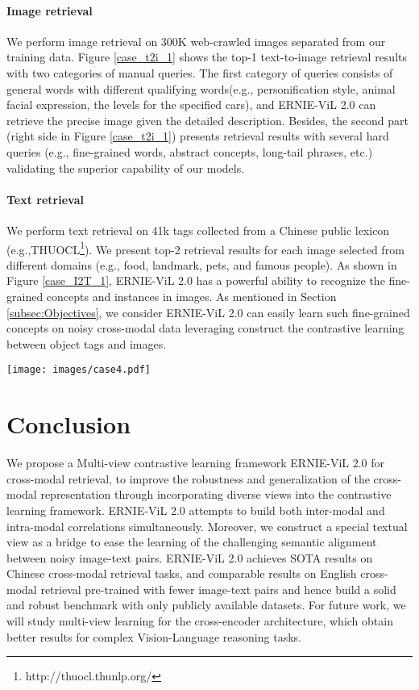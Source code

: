 \documentclass{article}
\begin{document}
\paragraph{Image retrieval} We perform image retrieval on 300K web-crawled images separated from our training data. Figure \ref{case_t2i_1} shows the top-1 text-to-image retrieval results with two categories of manual queries. The first category of queries consists of general words with different qualifying words(e.g., personification style, animal facial expression, the levels for the specified cars), and ERNIE-ViL 2.0 can retrieve the precise image given the detailed description. Besides, the second part (right side in Figure \ref{case_t2i_1}) presents retrieval results with several hard queries (e.g., fine-grained words, abstract concepts, long-tail phrases, etc.) validating the superior capability of our models.


\paragraph{Text retrieval}  We perform text retrieval on 41k tags collected from a Chinese public lexicon (e.g.,THUOCL\footnote{http://thuocl.thunlp.org/}). We present top-2 retrieval results for each image selected from different domains (e.g., food, landmark, pets, and famous people). As shown in Figure \ref{case_I2T_1}, ERNIE-ViL 2.0 has a powerful ability to recognize the fine-grained concepts and instances in images. As mentioned in Section \ref{subsec:Objectives}, we consider ERNIE-ViL 2.0 can easily learn such fine-grained concepts on noisy cross-modal data leveraging construct the contrastive learning between object tags and images.

\begin{figure*}[]
\centering
\texttt{[image: images/case4.pdf]}
\caption{The text retrieval with images from different domains (e.g., Landmark, famous people, artworks, flowers, pets, foods, etc.) using ERNIE-ViL 2.0's embeddings.}
\label{case_I2T_1}
\end{figure*} 
\section{Conclusion}
We propose a Multi-view contrastive learning framework ERNIE-ViL 2.0 for cross-modal retrieval, to improve the robustness and generalization of the cross-modal representation through incorporating diverse views into the contrastive learning framework. ERNIE-ViL 2.0 attempts to build both inter-modal and intra-modal correlations simultaneously. Moreover, we construct a special textual view as a bridge to ease the learning of the challenging semantic alignment between noisy image-text pairs. ERNIE-ViL 2.0 achieves SOTA results on Chinese cross-modal retrieval tasks, and comparable results on English cross-modal retrieval pre-trained with fewer image-text pairs and hence build a solid and robust benchmark with only publicly available datasets. For future work, we will study multi-view learning for the cross-encoder architecture, which obtain better results for complex Vision-Language reasoning tasks. 
\end{document}
